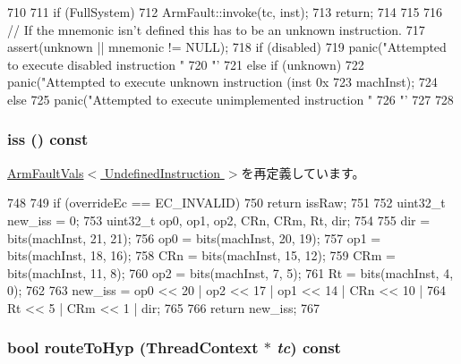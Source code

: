 \begin{DoxyCode}
710 {
711     if (FullSystem) {
712         ArmFault::invoke(tc, inst);
713         return;
714     }
715 
716     // If the mnemonic isn't defined this has to be an unknown instruction.
717     assert(unknown || mnemonic != NULL);
718     if (disabled) {
719         panic("Attempted to execute disabled instruction "
720                 "'%
721     } else if (unknown) {
722         panic("Attempted to execute unknown instruction (inst 0x%
723               machInst);
724     } else {
725         panic("Attempted to execute unimplemented instruction "
726                 "'%
727     }
728 }
\end{DoxyCode}
\hypertarget{classArmISA_1_1UndefinedInstruction_a54f4d33ac162a95fd5b3830cf7fab8ff}{
\subsubsection[{iss}]{ iss () const}}
\label{classArmISA_1_1UndefinedInstruction_a54f4d33ac162a95fd5b3830cf7fab8ff}


\hyperlink{classArmISA_1_1ArmFaultVals_a1049bf31f8df10c66994603055cf531d}{ArmFaultVals$<$ UndefinedInstruction $>$}を再定義しています。


\begin{DoxyCode}
748 {
749     if (overrideEc == EC_INVALID)
750         return issRaw;
751 
752     uint32_t new_iss = 0;
753     uint32_t op0, op1, op2, CRn, CRm, Rt, dir;
754 
755     dir = bits(machInst, 21, 21);
756     op0 = bits(machInst, 20, 19);
757     op1 = bits(machInst, 18, 16);
758     CRn = bits(machInst, 15, 12);
759     CRm = bits(machInst, 11, 8);
760     op2 = bits(machInst, 7, 5);
761     Rt = bits(machInst, 4, 0);
762 
763     new_iss = op0 << 20 | op2 << 17 | op1 << 14 | CRn << 10 |
764             Rt << 5 | CRm << 1 | dir;
765 
766     return new_iss;
767 }
\end{DoxyCode}
\hypertarget{classArmISA_1_1UndefinedInstruction_a16facd13ba8e6d15d2b865882c379d5f}{
\subsubsection[{routeToHyp}]{\setlength{\rightskip}{0pt plus 5cm}bool routeToHyp ({\bf ThreadContext} $\ast$ {\em tc}) const}}
\label{classArmISA_1_1UndefinedInstruction_a16facd13ba8e6d15d2b865882c379d5f}


